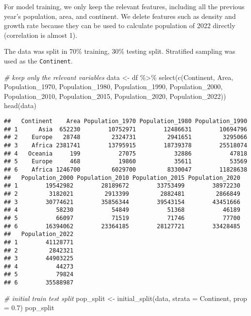 \documentclass[
]{article}
\newenvironment{Shaded}{\begin{snugshade}}{\end{snugshade}}
\newcommand{\AttributeTok}[1]{\textcolor[rgb]{0.77,0.63,0.00}{#1}}
\newcommand{\CommentTok}[1]{\textcolor[rgb]{0.56,0.35,0.01}{\textit{#1}}}
\newcommand{\FloatTok}[1]{\textcolor[rgb]{0.00,0.00,0.81}{#1}}
\newcommand{\FunctionTok}[1]{\textcolor[rgb]{0.00,0.00,0.00}{#1}}
\newcommand{\NormalTok}[1]{#1}
\newcommand{\OtherTok}[1]{\textcolor[rgb]{0.56,0.35,0.01}{#1}}
\newcommand{\SpecialCharTok}[1]{\textcolor[rgb]{0.00,0.00,0.00}{#1}}
\begin{document}
For model training, we only keep the relevant features, including all
the previous year's population, area, and continent. We delete features
such as density and growth rate because they can be used to calculate
population of 2022 directly (correlation is almost 1).

The data was split in 70\% training, 30\% testing split. Stratified
sampling was used as the \texttt{Continent}.

\begin{Shaded}
\begin{Highlighting}[]
\CommentTok{\# keep only the relevant variables}
\NormalTok{data }\OtherTok{\textless{}{-}}\NormalTok{ df }\SpecialCharTok{\%\textgreater{}\%} \FunctionTok{select}\NormalTok{(}\FunctionTok{c}\NormalTok{(Continent, Area, Population\_1970, }
\NormalTok{                        Population\_1980, Population\_1990, Population\_2000,}
\NormalTok{                        Population\_2010, Population\_2015, Population\_2020,}
\NormalTok{                        Population\_2022))}
\FunctionTok{head}\NormalTok{(data) }
\end{Highlighting}
\end{Shaded}

\begin{verbatim}
##   Continent    Area Population_1970 Population_1980 Population_1990
## 1      Asia  652230        10752971        12486631        10694796
## 2    Europe   28748         2324731         2941651         3295066
## 3    Africa 2381741        13795915        18739378        25518074
## 4   Oceania     199           27075           32886           47818
## 5    Europe     468           19860           35611           53569
## 6    Africa 1246700         6029700         8330047        11828638
##   Population_2000 Population_2010 Population_2015 Population_2020
## 1        19542982        28189672        33753499        38972230
## 2         3182021         2913399         2882481         2866849
## 3        30774621        35856344        39543154        43451666
## 4           58230           54849           51368           46189
## 5           66097           71519           71746           77700
## 6        16394062        23364185        28127721        33428485
##   Population_2022
## 1        41128771
## 2         2842321
## 3        44903225
## 4           44273
## 5           79824
## 6        35588987
\end{verbatim}

\begin{Shaded}
\begin{Highlighting}[]
\CommentTok{\# initial train test split}
\NormalTok{pop\_split }\OtherTok{\textless{}{-}} \FunctionTok{initial\_split}\NormalTok{(data, }\AttributeTok{strata =}\NormalTok{ Continent, }\AttributeTok{prop =} \FloatTok{0.7}\NormalTok{)}
\NormalTok{pop\_split}
\end{Highlighting}
\end{Shaded}
\end{document}

